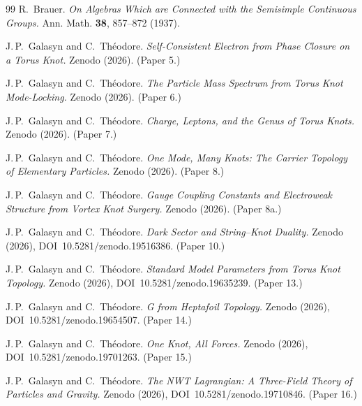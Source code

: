 \documentclass[11pt]{article}
\begin{document}
\begin{thebibliography}{99}
  R.~Brauer.
  \emph{On Algebras Which are Connected with the Semisimple
  Continuous Groups.}
  Ann. Math. \textbf{38}, 857--872 (1937).

  J.\,P.~Galasyn and C.~Th\'eodore.
  \emph{Self-Consistent Electron from Phase Closure on a Torus Knot.}
  Zenodo (2026).  (Paper 5.)

  J.\,P.~Galasyn and C.~Th\'eodore.
  \emph{The Particle Mass Spectrum from Torus Knot Mode-Locking.}
  Zenodo (2026).  (Paper 6.)

  J.\,P.~Galasyn and C.~Th\'eodore.
  \emph{Charge, Leptons, and the Genus of Torus Knots.}
  Zenodo (2026).  (Paper 7.)

  J.\,P.~Galasyn and C.~Th\'eodore.
  \emph{One Mode, Many Knots: The Carrier Topology of Elementary
  Particles.}
  Zenodo (2026).  (Paper 8.)

  J.\,P.~Galasyn and C.~Th\'eodore.
  \emph{Gauge Coupling Constants and Electroweak Structure from
  Vortex Knot Surgery.}
  Zenodo (2026).  (Paper 8a.)

  J.\,P.~Galasyn and C.~Th\'eodore.
  \emph{Dark Sector and String--Knot Duality.}
  Zenodo (2026), DOI~10.5281/zenodo.19516386.  (Paper 10.)

  J.\,P.~Galasyn and C.~Th\'eodore.
  \emph{Standard Model Parameters from Torus Knot Topology.}
  Zenodo (2026), DOI~10.5281/zenodo.19635239.  (Paper 13.)

  J.\,P.~Galasyn and C.~Th\'eodore.
  \emph{G from Heptafoil Topology.}
  Zenodo (2026), DOI~10.5281/zenodo.19654507.  (Paper 14.)

  J.\,P.~Galasyn and C.~Th\'eodore.
  \emph{One Knot, All Forces.}
  Zenodo (2026), DOI~10.5281/zenodo.19701263.  (Paper 15.)

  J.\,P.~Galasyn and C.~Th\'eodore.
  \emph{The NWT Lagrangian: A Three-Field Theory of Particles and
  Gravity.}
  Zenodo (2026), DOI~10.5281/zenodo.19710846.  (Paper 16.)

\end{thebibliography}
\end{document}
